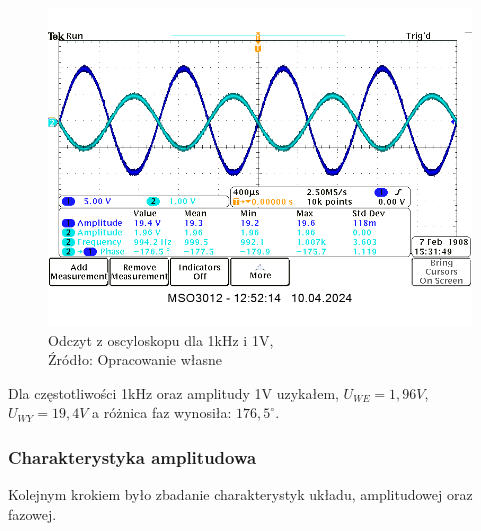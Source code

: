 \documentclass{article}
\begin{document}
        \begin{figure}[!ht]
          \centering
          \includegraphics[scale=0.45]{grafiki/1kHz_1V.png}
          \caption{Odczyt z oscyloskopu dla 1kHz i 1V,
          \\Źródło: Opracowanie własne}
        \end{figure}

        Dla częstotliwości 1kHz oraz amplitudy 1V uzykałem,  $U_{WE} = 1,96V$, $U_{WY} = 19,4V$ a różnica faz wynosiła: $176,5^\circ$.

      \subsubsection{Charakterystyka amplitudowa}
      Kolejnym krokiem było zbadanie charakterystyk układu, amplitudowej oraz fazowej.
\end{document}
